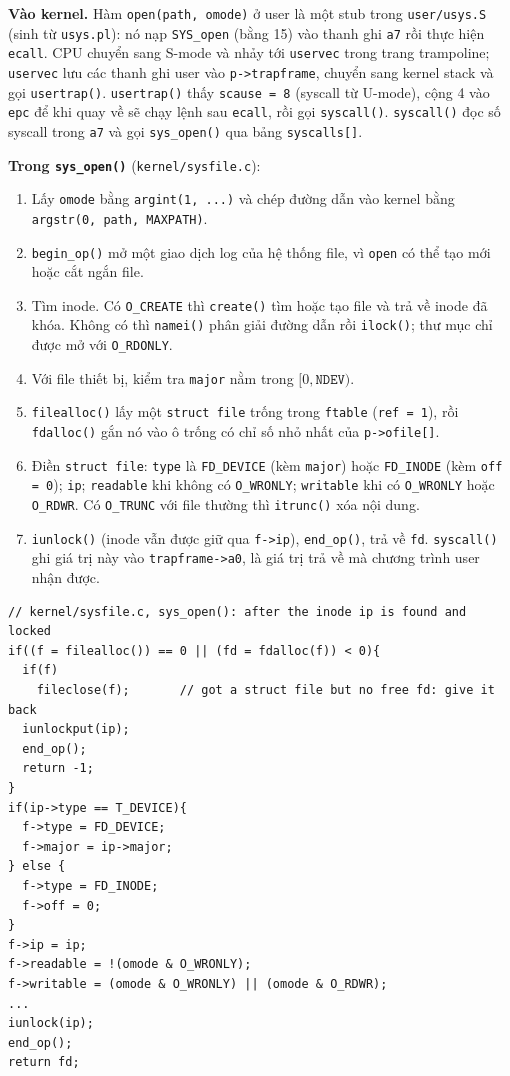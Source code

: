 \textbf{Vào kernel.} Hàm \texttt{open(path, omode)} ở user là một stub trong \texttt{user/usys.S} (sinh từ \texttt{usys.pl}): nó nạp \texttt{SYS\_open} (bằng 15) vào thanh ghi \texttt{a7} rồi thực hiện \texttt{ecall}. CPU chuyển sang S-mode và nhảy tới \texttt{uservec} trong trang trampoline; \texttt{uservec} lưu các thanh ghi user vào \texttt{p->trapframe}, chuyển sang kernel stack và gọi \texttt{usertrap()}. \texttt{usertrap()} thấy \texttt{scause = 8} (syscall từ U-mode), cộng 4 vào \texttt{epc} để khi quay về sẽ chạy lệnh sau \texttt{ecall}, rồi gọi \texttt{syscall()}. \texttt{syscall()} đọc số syscall trong \texttt{a7} và gọi \texttt{sys\_open()} qua bảng \texttt{syscalls[]}.

\textbf{Trong \texttt{sys\_open()}} (\texttt{kernel/sysfile.c}):
\begin{enumerate}
    \item Lấy \texttt{omode} bằng \texttt{argint(1, ...)} và chép đường dẫn vào kernel bằng \texttt{argstr(0, path, MAXPATH)}.
    \item \texttt{begin\_op()} mở một giao dịch log của hệ thống file, vì \texttt{open} có thể tạo mới hoặc cắt ngắn file.
    \item Tìm inode. Có \texttt{O\_CREATE} thì \texttt{create()} tìm hoặc tạo file và trả về inode đã khóa. Không có thì \texttt{namei()} phân giải đường dẫn rồi \texttt{ilock()}; thư mục chỉ được mở với \texttt{O\_RDONLY}.
    \item Với file thiết bị, kiểm tra \texttt{major} nằm trong $[0, \texttt{NDEV})$.
    \item \texttt{filealloc()} lấy một \texttt{struct file} trống trong \texttt{ftable} (\texttt{ref = 1}), rồi \texttt{fdalloc()} gắn nó vào ô trống có chỉ số nhỏ nhất của \texttt{p->ofile[]}.
    \item Điền \texttt{struct file}: \texttt{type} là \texttt{FD\_DEVICE} (kèm \texttt{major}) hoặc \texttt{FD\_INODE} (kèm \texttt{off = 0}); \texttt{ip}; \texttt{readable} khi không có \texttt{O\_WRONLY}; \texttt{writable} khi có \texttt{O\_WRONLY} hoặc \texttt{O\_RDWR}. Có \texttt{O\_TRUNC} với file thường thì \texttt{itrunc()} xóa nội dung.
    \item \texttt{iunlock()} (inode vẫn được giữ qua \texttt{f->ip}), \texttt{end\_op()}, trả về \texttt{fd}. \texttt{syscall()} ghi giá trị này vào \texttt{trapframe->a0}, là giá trị trả về mà chương trình user nhận được.
\end{enumerate}

\begin{lstlisting}[style=xv6code]
// kernel/sysfile.c, sys_open(): after the inode ip is found and locked
if((f = filealloc()) == 0 || (fd = fdalloc(f)) < 0){
  if(f)
    fileclose(f);       // got a struct file but no free fd: give it back
  iunlockput(ip);
  end_op();
  return -1;
}
if(ip->type == T_DEVICE){
  f->type = FD_DEVICE;
  f->major = ip->major;
} else {
  f->type = FD_INODE;
  f->off = 0;
}
f->ip = ip;
f->readable = !(omode & O_WRONLY);
f->writable = (omode & O_WRONLY) || (omode & O_RDWR);
...
iunlock(ip);
end_op();
return fd;
\end{lstlisting}

